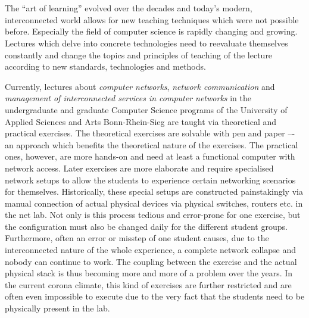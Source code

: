 \section*{}

The \enquote{art of learning} evolved over the decades and today's modern, interconnected world allows for new teaching techniques which were not possible before.
Especially the field of computer science is rapidly changing and growing. 
Lectures which delve into concrete technologies need to reevaluate
themselves constantly and change the topics and principles of teaching of the lecture according to new standards, technologies and methods.

Currently, lectures about \emph{computer networks}, \emph{network communication} and \emph{management of interconnected services in computer networks} in the undergraduate and graduate Computer Science programs of the University of Applied Sciences and Arts Bonn-Rhein-Sieg
are taught via theoretical and practical exercises.
The theoretical exercises are solvable with pen and paper –- an approach which benefits the theoretical nature of the exercises.
The practical ones, however, are more hands-on and need at least a functional computer with network access.
Later exercises are more elaborate and require specialised network setups to allow the students to experience certain networking scenarios for themselves. 
Historically, these special setups are constructed painstakingly via manual connection of actual physical devices via physical switches, routers etc. in the net lab.
Not only is this process tedious and error-prone for one exercise, 
but the configuration must also be changed daily for the different student groups.
Furthermore, often an error or misstep of one student causes,
due to the interconnected nature of the whole experience, a complete network collapse and nobody can continue to work.
The coupling between the exercise and the actual physical stack
is thus becoming more and more of a problem over the years.
In the current corona climate, this kind of exercises are further restricted and are often even impossible to execute due to the very fact that the students need to be physically present in the lab.

